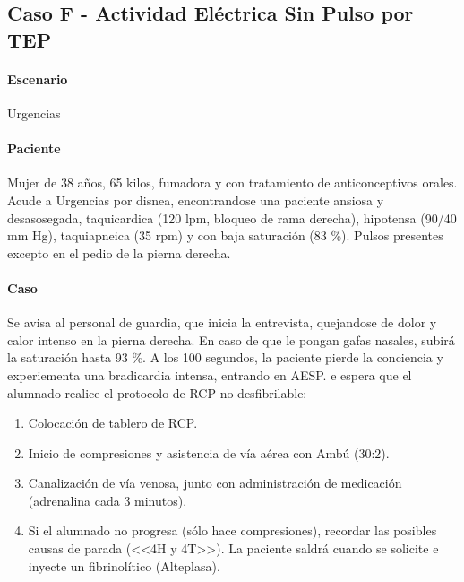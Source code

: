 \subsection{Caso F - Actividad Eléctrica Sin Pulso por TEP}
\paragraph{Escenario} Urgencias
\vspace{-12.5pt}
\paragraph{Paciente} Mujer de 38 años, 65 kilos, fumadora y con tratamiento de anticonceptivos orales. Acude a Urgencias por disnea, encontrandose una paciente ansiosa y desasosegada, taquicardica (120 lpm, bloqueo de rama derecha), hipotensa (90/40 mm Hg), taquiapneica (35 rpm) y con baja saturación (83 \%). Pulsos presentes excepto en el pedio de la pierna derecha.
\vspace{-12.5pt}
\paragraph{Caso} Se avisa al personal de guardia, que inicia la entrevista, quejandose de dolor y calor intenso en la pierna derecha. En caso de que le pongan gafas nasales, subirá la saturación hasta 93 \%. A los 100 segundos, la paciente pierde la conciencia y experiementa una bradicardia intensa, entrando en AESP. e espera que el alumnado realice el protocolo de RCP no desfibrilable:
\begin{enumerate}[topsep=0pt, partopsep=0pt,itemsep=0pt,parsep=0pt]
    \item Colocación de tablero de RCP.
    \item Inicio de compresiones y asistencia de vía aérea con Ambú (30:2).
    \item Canalización de vía venosa, junto con administración de medicación (adrenalina cada 3 minutos).
    \item Si el alumnado no progresa (sólo hace compresiones), recordar las posibles causas de parada (<<4H y 4T>>). La paciente saldrá cuando se solicite e inyecte un fibrinolítico (Alteplasa).
\end{enumerate}
\vspace{-12.5pt}
